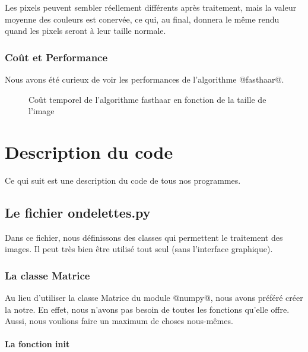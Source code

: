 \documentclass{article}
\begin{document}
Les pixels peuvent sembler réellement différents après traitement, mais la valeur moyenne des couleurs est conervée, ce qui, au final, donnera le même rendu quand les pixels seront à leur taille normale.

\clearpage

\subsubsection{Coût et Performance}

Nous avons été curieux de voir les performances de l'algorithme @fasthaar@.


\begin{figure}
\begin{center}

\label{bench}
\caption{Coût temporel de l'algorithme fasthaar en fonction de la taille de l'image}
\end{center}
\end{figure}







\section{Description du code}

Ce qui suit est une description du code de tous nos programmes.

\subsection{Le fichier ondelettes.py }

Dans ce fichier, nous définissons des classes qui permettent le traitement des images. Il peut très bien être utilisé tout seul (sans l'interface graphique). 

\subsubsection{La classe Matrice }

Au lieu d'utiliser la classe Matrice du module @numpy@, nous avons préféré créer la notre. En effet, nous n'avons pas besoin de toutes les fonctions qu'elle offre. Aussi, nous voulions faire un maximum de choses nous-mêmes.

\paragraph{La fonction init }
\end{document}
